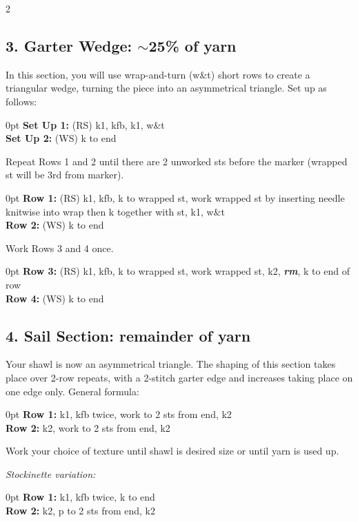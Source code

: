 \documentclass[12pt]{article}
\newcommand{\vocab}[1]{\emph{\textbf{#1}}} %
\newcommand{\rowDir}[1]{\textbf{#1:}} %
\renewcommand{\rm}{\vocab{rm}} %
\newenvironment{unframed}
    {%
	\begin{addmargin}[2em]{0pt}
	\small
	\setlength{\parindent}{-2em}}
    {\vspace{1em}
	\normalsize
	\end{addmargin}
	\setlength{\parindent}{0em}}
\begin{document}
\begin{multicols}{2}
\subsection*{3. Garter Wedge: $\sim$25\% of yarn}

In this section, you will use wrap-and-turn (w\&t) short rows to create a triangular wedge, turning the piece into an asymmetrical triangle. Set up as follows:
\begin{unframed}
\rowDir{Set Up 1} (RS) k1, kfb, k1, w\&t \\
\rowDir{Set Up 2} (WS) k to end
\end{unframed}

Repeat Rows 1 and 2 until there are 2 unworked sts before the marker (wrapped st will be 3rd from marker). 
\begin{unframed}
\rowDir{Row 1} (RS) k1, kfb, k to wrapped st, work wrapped st by inserting needle knitwise into wrap then k together with st, k1, w\&t \\
\rowDir{Row 2} (WS) k to end
\end{unframed}
Work Rows 3 and 4 once.
\begin{unframed}
\rowDir{Row 3} (RS) k1, kfb, k to wrapped st, work wrapped st, k2, \rm, k to end of row \\
\rowDir{Row 4} (WS) k to end
\end{unframed}

\vfill
\columnbreak

\subsection*{4. Sail Section: remainder of yarn}

Your shawl is now an asymmetrical triangle. The shaping of this section takes place over 2-row repeats, with a 2-stitch garter edge and increases taking place on one edge only. General formula:
\begin{unframed}
\rowDir{Row 1} k1, kfb twice, work to 2 sts from end, k2 \\
\rowDir{Row 2} k2, work to 2 sts from end, k2
\end{unframed}

Work your choice of texture until shawl is desired size or until yarn is used up.

\emph{Stockinette variation:}
\begin{unframed}
\rowDir{Row 1} k1, kfb twice, k to end \\
\rowDir{Row 2} k2, p to 2 sts from end, k2
\end{unframed}


\end{multicols}
\end{document}
